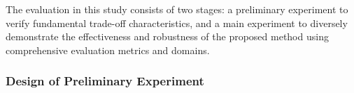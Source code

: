 \documentclass{article}
\begin{document}

The evaluation in this study consists of two stages: a preliminary experiment to verify fundamental trade-off characteristics, and a main experiment to diversely demonstrate the effectiveness and robustness of the proposed method using comprehensive evaluation metrics and domains.

\subsubsection{Design of Preliminary Experiment}
\end{document}
